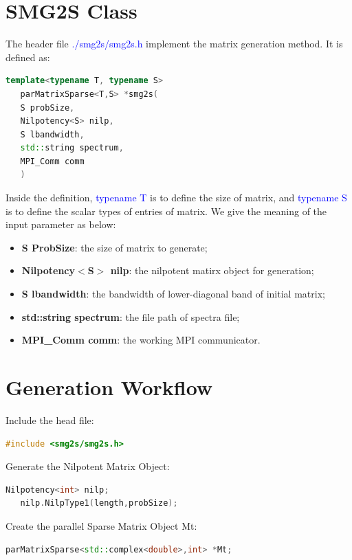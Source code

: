 \documentclass[a4paper, 10 pt]{report}
\begin{document}
	\section{SMG2S Class}
	The header file \textcolor{blue}{./smg2s/smg2s.h} implement the matrix generation method. It is defined as:
	
	\begin{lstlisting}[language=C++,frame=single]
   template<typename T, typename S>
   parMatrixSparse<T,S> *smg2s(
   S probSize,
   Nilpotency<S> nilp,
   S lbandwidth,
   std::string spectrum,
   MPI_Comm comm
   )
	\end{lstlisting}
	
	Inside the definition, \textcolor{blue}{typename T} is to define the size of matrix, and  \textcolor{blue}{typename S} is to define the scalar types of entries of matrix. We give the meaning of the input parameter as below:
	
	\begin{itemize}
		\item \textbf{S ProbSize}: the size of matrix to generate;
		\item \textbf{Nilpotency$<$S$>$ nilp}: the nilpotent matirx object for generation;
		\item \textbf{S lbandwidth}: the bandwidth of lower-diagonal band of initial matrix;
		\item \textbf{std::string spectrum}: the file path of spectra file;
		\item \textbf{MPI\_Comm comm}: the working MPI communicator.
	\end{itemize}
	
	
	\section{Generation Workflow}
	Include the head file:
	
	\begin{lstlisting}[language=C++,frame=single]
   #include <smg2s/smg2s.h>
	\end{lstlisting}
	
	Generate the Nilpotent Matrix Object:

	\begin{lstlisting}[language=C++,frame=single]
   Nilpotency<int> nilp;
   nilp.NilpType1(length,probSize);
	\end{lstlisting}

	Create the parallel Sparse Matrix Object Mt:

	\begin{lstlisting}[language=C++,frame=single]
   parMatrixSparse<std::complex<double>,int> *Mt;
	\end{lstlisting}
	
\end{document}
